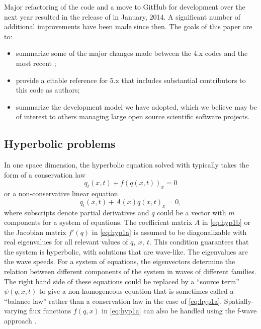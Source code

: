 Major refactoring of the code and a move to GitHub for development over the
next year resulted in the release of  in January, 2014. 
A significant number of additional improvements have been made since then. 
The goals of this paper are to:

\begin{itemize} 
\item summarize some of the major changes made between the \clawpack
4.x codes and the most recent ;  
\item provide a citable reference for \clawpack 5.x that includes
substantial contributors to this code as authors;
\item summarize the development model we have adopted, which we believe
may be of interest to others managing large open source scientific software
projects.
\end{itemize} 


\subsection{Hyperbolic problems}\label{sec:hyp}

In one space dimension, the hyperbolic equation solved with
\clawpack typically takes the form of a conservation law
\begin{equation}\label{eq:hyp1a}
q_t(x,t) + f(q(x,t))_x = 0
\end{equation}
or a non-conservative linear equation
\begin{equation}\label{eq:hyp1b}
q_t(x,t) + A(x)q(x,t)_x = 0,
\end{equation} 
where subscripts denote partial derivatives and
$q$ could be a vector with $m$ components for a system of equations. 
The coefficient matrix $A$ in \cref{eq:hyp1b} or the Jacobian matrix 
$f'(q)$ in \cref{eq:hyp1a} is assumed to be diagonalizable with real eigenvalues
for all relevant values of $q,~x,~t$. 
This condition
guarantees that the system is hyperbolic, with solutions that are wave-like.  
The eigenvalues are the wave speeds.  For a system of equations,
the eigenvectors determine the relation between different components of the
system in waves of different families.  The right hand side of these
equations could be replaced by a ``source term'' $\psi(q,x,t)$ to give a
non-homogeneous equation that is sometimes called a ``balance law'' rather
than a conservation law in the case of \cref{eq:hyp1a}.
Spatially-varying flux functions $f(q,x)$ in \cref{eq:hyp1a} can also be handled
using the f-wave approach \cite{db-rjl-sm-jr:vcflux}.

